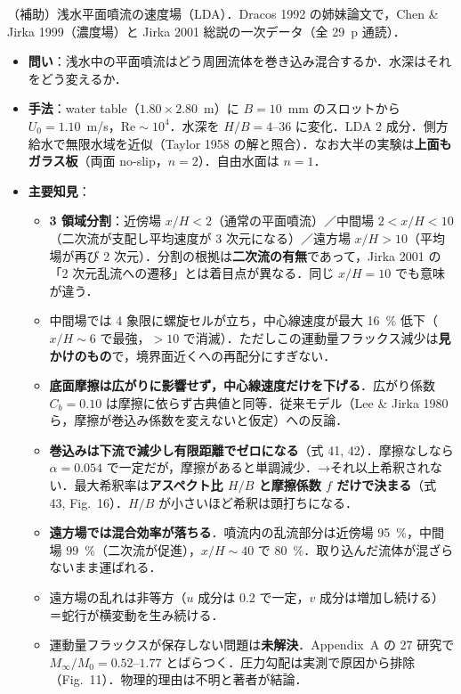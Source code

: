 \documentclass[11pt]{jsarticle}
\newcommand{\litref}[1]{{\large\bfseries\color{citecolor}#1}}
\begin{document}
\noindent\litref{Giger et al. (1991)}\quad（補助）浅水平面噴流の速度場（LDA）．Dracos 1992 の姉妹論文で，Chen \& Jirka 1999（濃度場）と Jirka 2001 総説の一次データ（全 29~p 通読）．
\begin{itemize}
  \item \textbf{問い}：浅水中の平面噴流はどう周囲流体を巻き込み混合するか．水深はそれをどう変えるか．
  \item \textbf{手法}：water table（$1.80 \times 2.80$~m）に $B = 10$~mm のスロットから $U_0 = 1.10$~m/s，$\mathrm{Re} \sim 10^4$．水深を $H/B = 4$--$36$ に変化．LDA 2 成分．側方給水で無限水域を近似（Taylor 1958 の解と照合）．なお大半の実験は\textbf{上面もガラス板}（両面 no-slip，$n = 2$）．自由水面は $n = 1$．
  \item \textbf{主要知見}：
  \begin{itemize}
    \item \textbf{3 領域分割}：近傍場 $x/H < 2$（通常の平面噴流）／中間場 $2 < x/H < 10$（二次流が支配し平均速度が 3 次元になる）／遠方場 $x/H > 10$（平均場が再び 2 次元）．分割の根拠は\textbf{二次流の有無}であって，Jirka 2001 の「2 次元乱流への遷移」とは着目点が異なる．同じ $x/H = 10$ でも意味が違う．
    \item 中間場では 4 象限に螺旋セルが立ち，中心線速度が最大 16~\% 低下（$x/H \sim 6$ で最強，$> 10$ で消滅）．ただしこの運動量フラックス減少は\textbf{見かけのもの}で，境界面近くへの再配分にすぎない．
    \item \textbf{底面摩擦は広がりに影響せず，中心線速度だけを下げる}．広がり係数 $C_b = 0.10$ は摩擦に依らず古典値と同等．従来モデル（Lee \& Jirka 1980 ら，摩擦が巻込み係数を変えないと仮定）への反論．
    \item \textbf{巻込みは下流で減少し有限距離でゼロになる}（式 41, 42）．摩擦なしなら $\alpha = 0.054$ で一定だが，摩擦があると単調減少．→それ以上希釈されない．最大希釈率は\textbf{アスペクト比 $H/B$ と摩擦係数 $f$ だけで決まる}（式 43, Fig.~16）．$H/B$ が小さいほど希釈は頭打ちになる．
    \item \textbf{遠方場では混合効率が落ちる}．噴流内の乱流部分は近傍場 95~\%，中間場 99~\%（二次流が促進），$x/H \sim 40$ で 80~\%．取り込んだ流体が混ざらないまま運ばれる．
    \item 遠方場の乱れは非等方（$u$ 成分は 0.2 で一定，$v$ 成分は増加し続ける）＝蛇行が横変動を生み続ける．
    \item 運動量フラックスが保存しない問題は\textbf{未解決}．Appendix~A の 27 研究で $M_\infty/M_0 = 0.52$--$1.77$ とばらつく．圧力勾配は実測で原因から排除（Fig.~11）．物理的理由は不明と著者が結論．

\end{itemize}
\end{itemize}
\end{document}
